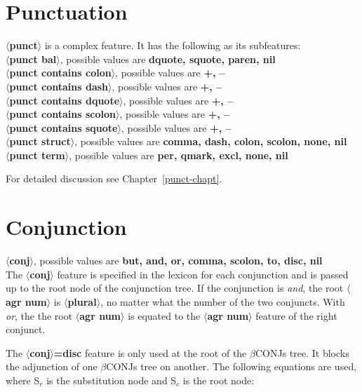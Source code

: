 \section{Punctuation}
{\bf $\langle$punct$\rangle$} is a complex feature. It has the following
as its subfeatures:\\
{\bf $\langle$punct bal$\rangle$}, possible values are {\bf dquote,
squote, paren, nil}\\
{\bf $\langle$punct contains colon$\rangle$}, possible values are {\bf +, --}\\
{\bf $\langle$punct contains dash$\rangle$}, possible values are {\bf +, --}\\
{\bf $\langle$punct contains dquote$\rangle$}, possible values are {\bf +, --}\\
{\bf $\langle$punct contains scolon$\rangle$}, possible values are {\bf +, --}\\
{\bf $\langle$punct contains squote$\rangle$}, possible values are {\bf +, --}\\
{\bf $\langle$punct struct$\rangle$}, possible values are {\bf comma,
dash, colon, scolon, none, nil}\\
{\bf $\langle$punct term$\rangle$}, possible values are {\bf per, qmark, excl, 
none, nil}

For detailed discussion see Chapter~\ref{punct-chapt}.


\section{Conjunction}
{\bf $\langle$conj$\rangle$}, possible values are {\bf but, and, or,
comma, scolon, to, disc, nil}\\
The {\bf $\langle$conj$\rangle$} feature is specified in the lexicon
for each conjunction and is passed up to the root node 
of the conjunction tree. If the conjunction is {\em and}, the 
root {\bf $\langle$agr num$\rangle$} is {\bf $\langle$plural$\rangle$}, no
matter what the number of the two conjuncts. With {\em or}, the
the root {\bf $\langle$agr num$\rangle$} is equated to the
{\bf $\langle$agr num$\rangle$} feature of the right conjunct. 


The {\bf $\langle$conj$\rangle$=disc} feature is only used at the root
of  the
$\beta$CONJs tree.  It blocks the adjunction of one $\beta$CONJs tree
on another.  The following equations are used, where S$_{r}$ is
the substitution node and S$_{c}$ is the root node:


